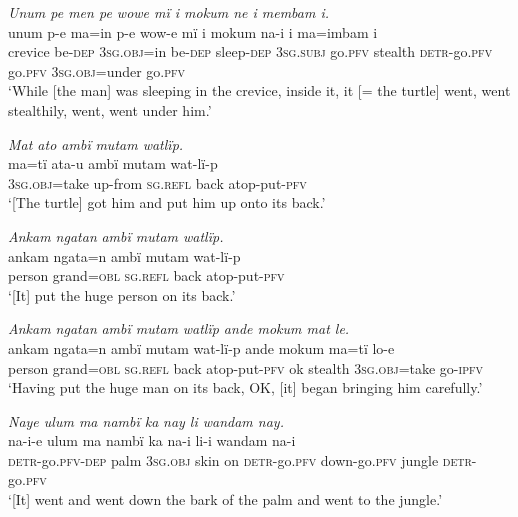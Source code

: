 \newpage

\ex \textit{Un}{\textit{u}}\textit{m pe men pe wowe mï i m}{\textit{o}}\textit{kum ne i membam i.}\\
\gll un{u}m{} p{{}-}e    m{a=i}n{} p{{}-}e    wow{}-e    mï      i    mokum n{a-i} i    m{a=i}mbam    i\\
crevice  be-\textsc{dep}  \textsc{3sg.obj}=in  be-\textsc{dep}  sleep-\textsc{dep}  \textsc{3sg.subj}  go\textsc{.pfv}  stealth \textsc{detr-}go.\textsc{pfv}  go.\textsc{pfv}  \textsc{3sg.obj=}under  go.\textsc{pfv}\\
\glt ‘{While [the man] was sleeping in the crevice, inside it, i}t [= the turtle] went, went stealthily, went, went under him.’

\ex \textit{Mat at}{\textit{o a}}\textit{mb}{\textit{ï}} \textit{m}{\textit{u}}\textit{ta}{\textit{m w}}\textit{atlïp.}\\
\gll ma{=}tï      ata-u    amb{ï} m{u}tam  wat{{}-}l{ï-}p\\
3\textsc{sg.obj}=take  up-from  \textsc{sg.refl}  back  atop-put-\textsc{pfv}\\
\glt ‘[The turtle] got him and put him up onto its back.’

\ex \textit{Ankam ngatan} {\textit{ambï mutam w}}\textit{atlïp.}\\
\gll ankam  ngata=n    ambï    mutam  wat{{}-}l{ï-}p\\
person  grand=\textsc{obl}  \textsc{sg.refl}  back  atop-put-\textsc{pfv}\\
\glt ‘[It] put the huge person on its back.’

\ex \textit{Ankam ngatan} {\textit{a}}\textit{mb}{\textit{ï m}}\textit{utam} {\textit{w}}\textit{at}{\textit{l}}\textit{ïp ande m}{\textit{o}}\textit{kum mat le.}\\
\gll ankam  ngata=n    {a}mbï    mutam  {w}at{{}-lï-}p    ande  m{o}kum ma{=}tï lo-e\\
person  grand=\textsc{obl}  \textsc{sg.refl}  back  atop-put-\textsc{pfv}  ok    {stealth} 3\textsc{sg.obj}=take  go-\textsc{ipfv}\\
\glt ‘Having put the huge man on its back, OK, [it] began bringing him carefully.’

\ex \textit{Naye ulum ma  na}{\textit{mbï ka}} \textit{nay li wandam nay.}\\
\gll na{{}-i-e} ulum  ma{} nambï  ka na{{}-i} li-i      wandam  na{{}-i}\\
\textsc{detr-}go.\textsc{pfv-dep}  palm  3\textsc{sg.obj}  skin  on  \textsc{detr-}go.\textsc{pfv} down-go.\textsc{pfv}  jungle \textsc{detr-}go.\textsc{pfv}\\
\glt ‘{[It] went and went down the bark of the palm and went to the jungle.}’

